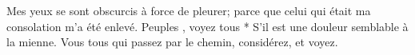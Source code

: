 Mes yeux se sont obscurcis à force de pleurer; parce que celui qui était ma consolation m’a été enlevé. Peuples , voyez tous * S’il est une douleur semblable à la mienne.
\versseparator
Vous tous qui passez par le chemin, considérez, et voyez.